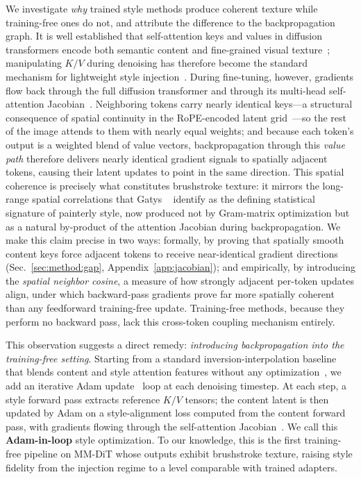 We investigate \emph{why} trained style methods produce coherent
texture while training-free ones do not, and attribute the difference to the
backpropagation graph.
It is well established that self-attention keys and values in diffusion
transformers encode both semantic content and fine-grained visual
texture~\cite{hertz2022prompt,chung2024styleid,seg4diff2025,gan2025ditf};
manipulating $K/V$ during denoising has therefore become the standard
mechanism for lightweight style injection~\cite{hertz2024style,xu2025stylessp}.
During fine-tuning, however, gradients flow back through the full diffusion
transformer and through its multi-head self-attention
Jacobian~\cite{vaswani2017attention}.
Neighboring tokens carry nearly identical keys—a structural consequence of
spatial continuity in the RoPE-encoded latent
grid~\cite{su2024rope,esser2024scaling}—so the rest of the image attends to
them with nearly equal weights; and because each token's output is a weighted
blend of value vectors, backpropagation through this \emph{value path}
therefore delivers nearly identical gradient signals to spatially adjacent
tokens, causing their latent updates to point in the same direction.
This spatial coherence is precisely what constitutes brushstroke texture:
it mirrors the long-range spatial correlations that Gatys
\etal~\cite{gatys2016image} identify as the defining statistical signature of
painterly style, now produced not by Gram-matrix optimization but as a natural
by-product of the attention Jacobian during backpropagation.
We make this claim precise in two ways: formally, by proving that
spatially smooth content keys force adjacent tokens to receive near-identical
gradient directions (Sec.~\ref{sec:method:gap},
Appendix~\ref{app:jacobian}); and empirically, by introducing the
\emph{spatial neighbor cosine}, a measure of how strongly adjacent per-token
updates align, under which backward-pass gradients prove far more spatially
coherent than any feedforward training-free update.
Training-free methods, because they perform no backward pass, lack this
cross-token coupling mechanism entirely.

This observation suggests a direct remedy: \emph{introducing
backpropagation into the training-free setting}.
Starting from a standard inversion-interpolation baseline that blends content
and style attention features without any
optimization~\cite{hertz2024style,chung2024styleid,xu2025stylessp,avrahami2025stableflow},
we add an iterative Adam update~\cite{kingma2015adam} loop at each denoising
timestep.
At each step, a style forward pass extracts reference $K/V$ tensors; the
content latent is then updated by Adam on a style-alignment loss computed
from the content forward pass, with gradients flowing through the
self-attention Jacobian~\cite{vaswani2017attention}.
We call this \textbf{Adam-in-loop} style optimization.
To our knowledge, this is the first training-free pipeline on MM-DiT
whose outputs exhibit brushstroke texture, raising style fidelity from the
injection regime to a level comparable with trained adapters.

